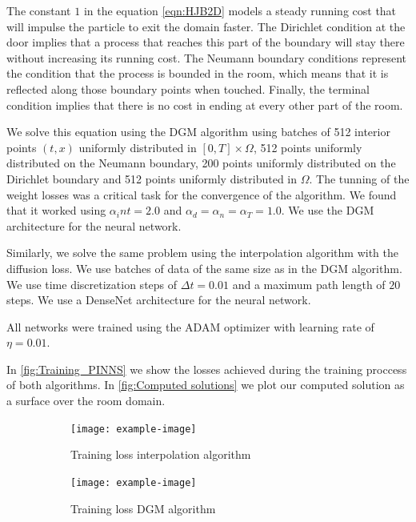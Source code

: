 The constant $1$ in the equation \eqref{eqn:HJB2D} models a steady running cost that will impulse the particle to exit the domain faster. The Dirichlet condition at the door implies that a process that reaches this part of the boundary will stay there without increasing its running cost. The Neumann boundary conditions represent the condition that the process is bounded in the room, which means that it is reflected along those boundary points when touched. Finally, the terminal condition implies that there is no cost in ending at every other part of the room. 

We solve this equation using the DGM algorithm using batches of 512 interior points $(t,x)$ uniformly distributed  in $[0,T]\times \Omega$, 512 points uniformly distributed  on the Neumann boundary, 200 points uniformly distributed on the Dirichlet boundary and 512 points uniformly distributed in $\Omega$. The tunning of the weight losses was a critical task for the convergence of the algorithm. We found that it worked using $\alpha_int=2.0$ and $\alpha_d=\alpha_n=\alpha_T=1.0$. We use the DGM architecture for the neural network.

Similarly, we solve the same problem using the interpolation algorithm with the diffusion loss. We use batches of data of the same size as in the DGM algorithm. We use time discretization steps of $\Delta t=0.01$ and a maximum path length of $20$ steps. We use a DenseNet architecture for the neural network.

All networks were trained using the ADAM optimizer with learning rate of $\eta=0.01$.

In \autoref{fig:Training_PINNS} we show the losses achieved during the training proccess of both algorithms. In \autoref{fig:Computed solutions} we plot our computed solution as a surface over the room domain. 

\begin{figure}[htb!]		
	\begin{subfigure}{.475\linewidth}
		\texttt{[image: example-image]}
		\caption{Training loss interpolation algorithm}
		\label{fig:Interpolation_loss}
	\end{subfigure}\hfill %
	\begin{subfigure}{.475\linewidth}
		\texttt{[image: example-image]}
		\caption{Training loss DGM algorithm}
		\label{fig:DGM_algorithm}
	\end{subfigure}
	\caption{}
	\label{fig:Training_PINNS}
\end{figure}

